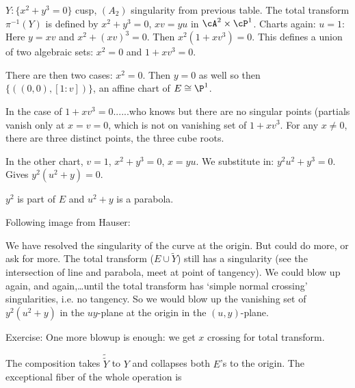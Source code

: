 \begin{ex}
$Y: \{x^2+y^3=0\}$ cusp, $(A_2)$ singularity from previous table. The total transform $\pi^{-1}(Y)$ is defined by $x^2+y^3=0$, $xv=yu$ in $\cA^2 \times \cP^1$. Charts again: $u=1$: Here $y=xv$ and $x^2+(xv)^3=0$. Then $x^2(1+xv^3)=0$. This defines a union of two algebraic sets: $x^2=0$ and $1+xv^3=0$. 

There are then two cases: $x^2=0$. Then $y=0$ as well so then $\{((0,0), [1:v])\}$, an affine chart of $E \cong \P^1$. 

In the case of $1+xv^3=0$......who knows but there are no singular points (partials vanish only at $x=v=0$, which is not on vanishing set of $1+xv^3$. For any $x \neq 0$, there are three distinct points, the three cube roots. 

In the other chart, $v=1$, $x^2+y^3=0$, $x=yu$. We substitute in: $y^2u^2+y^3=0$. Gives $y^2(u^2+y)=0$. 

$y^2$ is part of $E$ and $u^2+y$ is a parabola. 


Following image from Hauser:


We have resolved the singularity of the curve at the origin. But could do more, or ask for more. The total transform ($E \cup \tilde{Y}$) still has a singularity (see the intersection of line and parabola, meet at point of tangency). We could blow up again, and again,\dots until the total transform has `simple normal crossing' singularities, i.e. no tangency. So we would blow up the vanishing set of $y^2(u^2+y)$ in the $uy$-plane at the origin in the $(u,y)$-plane.
\end{ex}

Exercise: One more blowup is enough: we get $x$ crossing for total transform.


The composition takes $\tilde{\tilde{Y}}$ to $Y$ and collapses both $E$'s to the origin. The exceptional fiber of the whole operation is

